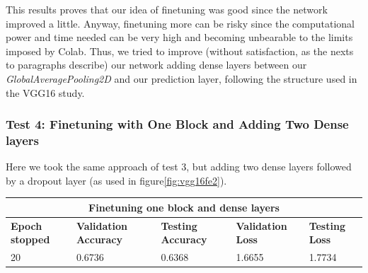 This results proves that our idea of finetuning was good since the network improved a little. Anyway, finetuning more can be risky since the computational power and time needed can be very high and becoming unbearable to the limits imposed by Colab. Thus, we tried to improve (without satisfaction, as the nexts to paragraphs describe) our network adding dense layers between our \textit{GlobalAveragePooling2D} and our prediction layer, following the structure used in the VGG16 study.



\subsubsection{Test 4: Finetuning with One Block and Adding Two Dense layers}
Here we took the same approach of test 3, but adding two dense layers followed by a dropout layer (as used in figure\ref{fig:vgg16fe2}).

\medskip

\begin{tabular}{ |p{2cm}|p{2cm}|p{2cm}|p{2cm}|p{2cm}|  }
\hline
\multicolumn{5}{|c|}{Finetuning one block and dense layers} \\
\hline
\textbf{Epoch stopped} & \textbf{Validation Accuracy} & \textbf{Testing Accuracy} & \textbf{Validation Loss} & \textbf{Testing Loss} \\
\hline
20 & 0.6736 & 0.6368 & 1.6655 & 1.7734\\
\hline
\end{tabular}

